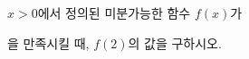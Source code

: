 \hspace*{2mm}\begin{minipage}[t]{\dimexpr\linewidth-2mm\relax}\vspace{0pt}
$x>0$에서 정의된 미분가능한 함수 $f(x)$가 \par\smallskip{}\par\smallskip\noindent 을 만족시킬 때, $f(2)$의 값을 구하시오.\end{minipage}
